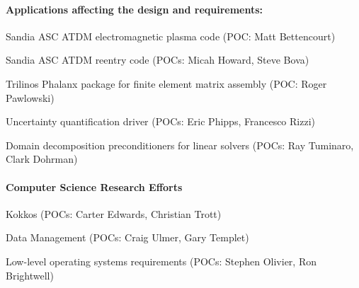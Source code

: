 \paragraph{Applications affecting the design and requirements:}
\begin{compactitem}
\item Sandia \gls{ASC} \gls{ATDM} electromagnetic plasma code (POC: Matt Bettencourt)
\item Sandia \gls{ASC} \gls{ATDM} reentry code (POCs: Micah Howard, Steve Bova)
\item \gls{Trilinos} Phalanx package for finite element matrix assembly (POC: Roger Pawlowski)
\item Uncertainty quantification driver (POCs: Eric Phipps, Francesco Rizzi)
\item Domain decomposition preconditioners for linear solvers (POCs: Ray Tuminaro, Clark Dohrman)
\end{compactitem}
 
\paragraph{Computer Science Research Efforts}
\begin{compactitem}
\item Kokkos (POCs: Carter Edwards, Christian Trott)
\item Data Management (POCs: Craig Ulmer, Gary Templet)
\item Low-level operating systems requirements (POCs: Stephen Olivier, Ron
    Brightwell)
\end{compactitem}



